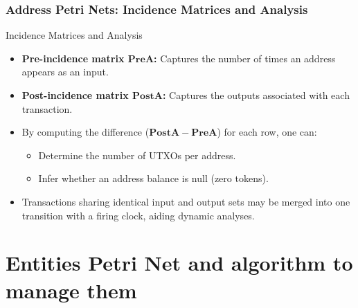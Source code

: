 \documentclass{beamer}
\begin{document}
\begin{frame}
    \frametitle{Address Petri Nets: Incidence Matrices and Analysis}
    \begin{block}{Incidence Matrices and Analysis}
        \begin{itemize}
            \item \textbf{Pre-incidence matrix \(\mathbf{PreA}\):} Captures the number of times an address appears as an input.
            \item \textbf{Post-incidence matrix \(\mathbf{PostA}\):} Captures the outputs associated with each transaction.
            \item By computing the difference (\(\mathbf{PostA} - \mathbf{PreA}\)) for each row, one can:
                  \begin{itemize}
                      \item Determine the number of UTXOs per address.
                      \item Infer whether an address balance is null (zero tokens).
                  \end{itemize}
            \item Transactions sharing identical input and output sets may be merged into one transition with a firing clock, aiding dynamic analyses.
        \end{itemize}
    \end{block}

\end{frame}


\section{Entities Petri Net and algorithm to manage them}
\end{document}
